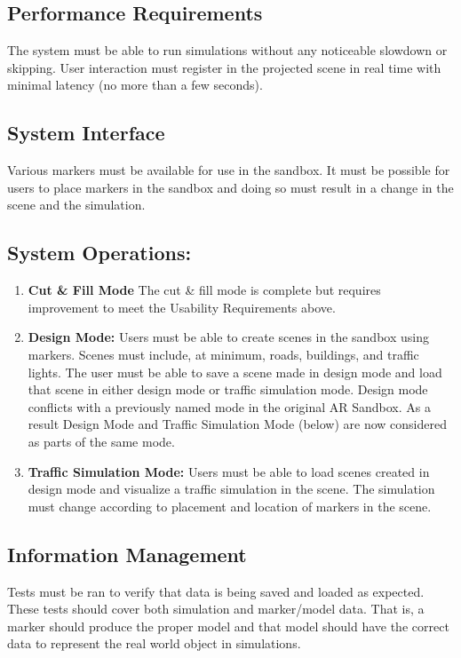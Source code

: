 \documentclass[letterpaper, 10pt, onecolumn, draftclsnofoot]{IEEEtran}
\begin{document}
    \subsection{\textbf{Performance Requirements}}
    The system must be able to run simulations without any noticeable slowdown or skipping. User interaction must register in the projected scene in real time with minimal latency (no more than a few seconds).
    
    \subsection{\textbf{System Interface}}
    Various markers must be available for use in the sandbox. It must be possible for users to place markers in the sandbox and doing so must result in a change in the scene and the simulation.

    \subsection{\textbf{System Operations:}}
        \begin{enumerate}[\label={}]
        \item{\textbf{Cut \& Fill Mode} The cut \& fill mode is complete but requires improvement to meet the Usability Requirements above.}
        
        \item{\textbf{Design Mode:} Users must be able to create scenes in the sandbox using markers. Scenes must include, at minimum, roads, buildings, and traffic lights. The user must be able to save a scene made in design mode and load that scene in either design mode or traffic simulation mode. Design mode conflicts with a previously named mode in the original AR Sandbox. As a result Design Mode and Traffic Simulation Mode (below) are now considered as parts of the same mode.}
        
        \item{\textbf{Traffic Simulation Mode:} Users must be able to load scenes created in design mode and visualize a traffic simulation in the scene. The simulation must change according to placement and location of markers in the scene.}
    \end{enumerate}
    
    \subsection{\textbf{Information Management}}
    Tests must be ran to verify that data is being saved and loaded as expected. These tests should cover both simulation and marker/model data. That is, a marker should produce the proper model and that model should have the correct data to represent the real world object in simulations.  
    
\end{document}
